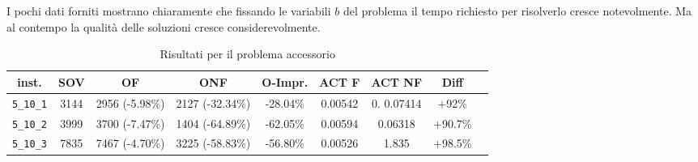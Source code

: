 I pochi dati forniti mostrano chiaramente che fissando le variabili $b$ del problema
il tempo richiesto per risolverlo cresce notevolmente. Ma al contempo la qualità
delle soluzioni cresce considerevolmente.


\begin{table}[h!]
\begin{center}
\small
\begin{tabular}{| c | c | c | c | c | c | c | c | c | }
\hline
inst.			& SOV	& OF				& ONF 				& O-Impr. 	& ACT F 	& ACT NF 		& Diff \\
\hline
\verb|5_10_1|	& 3144  	& 2956	(-5.98\%) 	& 2127 	(-32.34\%)	& -28.04\%	 			& 0.00542 	&  0. 0.07414 	& +92\% \\ 
\verb|5_10_2|	& 3999		& 3700	(-7.47\%)	& 1404	(-64.89\%)	& -62.05\%				& 0.00594	& 0.06318 		& +90.7\%\\
\verb|5_10_3|	& 7835		& 7467	(-4.70\%)	& 3225	(-58.83\%)	& -56.80\%				& 0.00526	& 1.835 		& +98.5\% \\

\hline
\end{tabular}
\caption{Risultati per il problema accessorio}
\label{table:accessorio:res}
\end{center}
\end{table}
